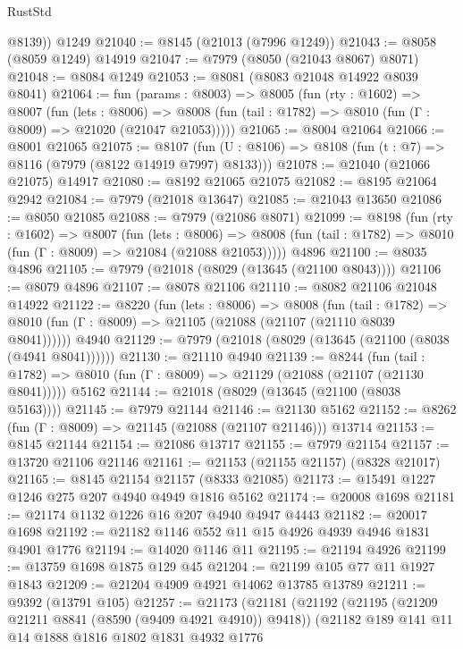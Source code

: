 \begin{lexlean}{RustStd}
\begin{coremodule}
        @8139))
    @1249
@21040 := @8145 (@21013 (@7996 @1249))
@21043 := @8058 (@8059 @1249) @14919
@21047 := @7979 (@8050 (@21043 @8067) @8071)
@21048 := @8084 @1249
@21053 := @8081 (@8083 @21048 @14922 @8039 @8041)
@21064 := fun (params : @8003) =>
  @8005
    (fun (rty : @1602) =>
    @8007
      (fun (lets : @8006) =>
      @8008 (fun (tail : @1782) => @8010 (fun (Γ : @8009) => @21020 (@21047 @21053)))))
@21065 := @8004 @21064
@21066 := @8001 @21065
@21075 := @8107
    (fun (U : @8106) => @8108 (fun (t : @7) => @8116 (@7979 (@8122 @14919 @7997) @8133)))
@21078 := @21040 (@21066 @21075) @14917
@21080 := @8192 @21065 @21075
@21082 := @8195 @21064 @2942
@21084 := @7979 (@21018 @13647)
@21085 := @21043 @13650
@21086 := @8050 @21085
@21088 := @7979 (@21086 @8071)
@21099 := @8198
    (fun (rty : @1602) =>
    @8007
      (fun (lets : @8006) =>
      @8008 (fun (tail : @1782) => @8010 (fun (Γ : @8009) => @21084 (@21088 @21053)))))
    @4896
@21100 := @8035 @4896
@21105 := @7979 (@21018 (@8029 (@13645 (@21100 @8043))))
@21106 := @8079 @4896
@21107 := @8078 @21106
@21110 := @8082 @21106 @21048 @14922
@21122 := @8220
    (fun (lets : @8006) =>
    @8008
      (fun (tail : @1782) =>
      @8010 (fun (Γ : @8009) => @21105 (@21088 (@21107 (@21110 @8039 @8041))))))
    @4940
@21129 := @7979 (@21018 (@8029 (@13645 (@21100 (@8038 (@4941 @8041))))))
@21130 := @21110 @4940
@21139 := @8244
    (fun (tail : @1782) => @8010 (fun (Γ : @8009) => @21129 (@21088 (@21107 (@21130 @8041)))))
    @5162
@21144 := @21018 (@8029 (@13645 (@21100 (@8038 @5163))))
@21145 := @7979 @21144
@21146 := @21130 @5162
@21152 := @8262 (fun (Γ : @8009) => @21145 (@21088 (@21107 @21146))) @13714
@21153 := @8145 @21144
@21154 := @21086 @13717
@21155 := @7979 @21154
@21157 := @13720 @21106 @21146
@21161 := @21153 (@21155 @21157) (@8328 @21017)
@21165 := @8145 @21154 @21157 (@8333 @21085)
@21173 := @15491 @1227 @1246 @275 @207 @4940 @4949 @1816 @5162
@21174 := @20008 @1698
@21181 := @21174 @1132 @1226 @16 @207 @4940 @4947 @4443
@21182 := @20017 @1698
@21192 := @21182 @1146 @552 @11 @15 @4926 @4939 @4946 @1831 @4901 @1776
@21194 := @14020 @1146 @11
@21195 := @21194 @4926
@21199 := @13759 @1698 @1875 @129 @45
@21204 := @21199 @105 @77 @11 @1927 @1843
@21209 := @21204 @4909 @4921 @14062 @13785 @13789
@21211 := @9392 (@13791 @105)
@21257 := @21173
    (@21181
      (@21192
        (@21195 (@21209 @21211 @8841 (@8590 (@9409 @4921 @4910)) @9418))
        (@21182
          @189
          @141
          @11
          @14
          @1888
          @1816
          @1802
          @1831
          @4932
          @1776

\end{coremodule}
\end{lexlean}
